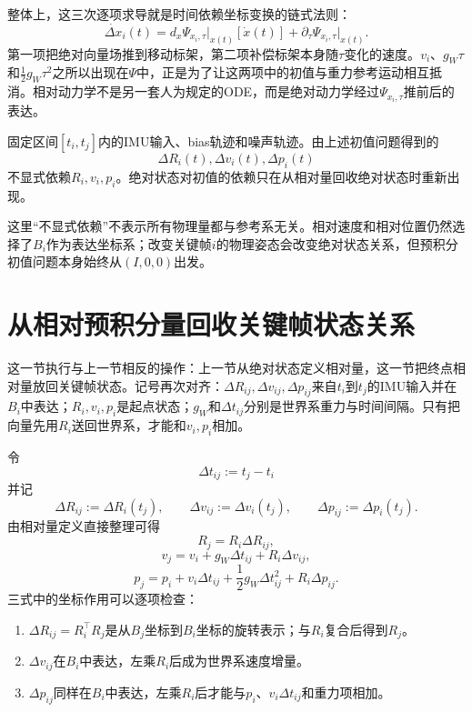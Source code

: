 整体上，这三次逐项求导就是时间依赖坐标变换的链式法则：
\[
\boxed{
    \dot{\Delta x}_i(t)
    =d_x\Psi_{x_i,\tau}\big|_{x(t)}[\dot x(t)]
      +\partial_\tau\Psi_{x_i,\tau}\big|_{x(t)}.
}
\]
第一项把绝对向量场推到移动标架，第二项补偿标架本身随$\tau$变化的速度。$v_i$、$g_W\tau$和$\tfrac12g_W\tau^2$之所以出现在$\Psi$中，正是为了让这两项中的初值与重力参考运动相互抵消。相对动力学不是另一套人为规定的ODE，而是绝对动力学经过$\Psi_{x_i,\tau}$推前后的表达。

\begin{proposition}[相对运动消去关键帧初始导航状态]
固定区间$[t_i,t_j]$内的IMU输入、bias轨迹和噪声轨迹。由上述初值问题得到的
\[
    \Delta R_i(t),\Delta v_i(t),\Delta p_i(t)
\]
不显式依赖$R_i,v_i,p_i$。绝对状态对初值的依赖只在从相对量回收绝对状态时重新出现。
\end{proposition}

这里“不显式依赖”不表示所有物理量都与参考系无关。相对速度和相对位置仍然选择了$B_i$作为表达坐标系；改变关键帧$i$的物理姿态会改变绝对状态关系，但预积分初值问题本身始终从$(I,0,0)$出发。


\section{从相对预积分量回收关键帧状态关系}

这一节执行与上一节相反的操作：上一节从绝对状态定义相对量，这一节把终点相对量放回关键帧状态。记号再次对齐：$\Delta R_{ij},\Delta v_{ij},\Delta p_{ij}$来自$t_i$到$t_j$的IMU输入并在$B_i$中表达；$R_i,v_i,p_i$是起点状态；$g_W$和$\Delta t_{ij}$分别是世界系重力与时间间隔。只有把向量先用$R_i$送回世界系，才能和$v_i,p_i$相加。

令
\[
    \Delta t_{ij}:=t_j-t_i
\]
并记
\[
    \Delta R_{ij}:=\Delta R_i(t_j),
    \qquad
    \Delta v_{ij}:=\Delta v_i(t_j),
    \qquad
    \Delta p_{ij}:=\Delta p_i(t_j).
\]
由相对量定义直接整理可得
\[
\boxed{
    R_j=R_i\Delta R_{ij},
}
\]
\[
\boxed{
    v_j=v_i+g_W\Delta t_{ij}+R_i\Delta v_{ij},
}
\]
\[
\boxed{
    p_j=p_i+v_i\Delta t_{ij}
    +\frac12g_W\Delta t_{ij}^2
    +R_i\Delta p_{ij}.
}
\]
三式中的坐标作用可以逐项检查：
\begin{enumerate}
    \item $\Delta R_{ij}=R_i^\top R_j$是从$B_j$坐标到$B_i$坐标的旋转表示；与$R_i$复合后得到$R_j$。
    \item $\Delta v_{ij}$在$B_i$中表达，左乘$R_i$后成为世界系速度增量。
    \item $\Delta p_{ij}$同样在$B_i$中表达，左乘$R_i$后才能与$p_i$、$v_i\Delta t_{ij}$和重力项相加。
\end{enumerate}

